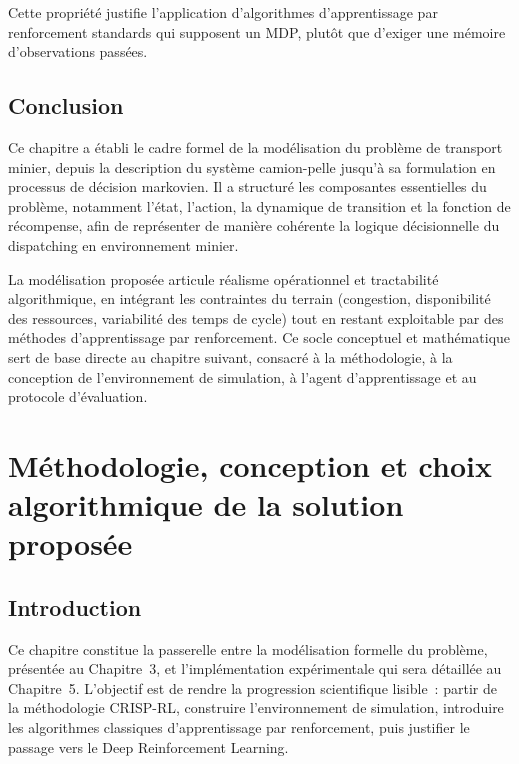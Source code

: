 \documentclass[11pt,a4paper]{report}
\begin{document}
Cette propriété justifie l'application d'algorithmes d'apprentissage par renforcement standards qui supposent un MDP, plutôt que d'exiger une mémoire d'observations passées.

\section{Conclusion}
\label{sec:conclusion-modelisation}

Ce chapitre a établi le cadre formel de la modélisation du problème de transport minier, depuis la description du système camion-pelle jusqu'à sa formulation en processus de décision markovien. Il a structuré les composantes essentielles du problème, notamment l'état, l'action, la dynamique de transition et la fonction de récompense, afin de représenter de manière cohérente la logique décisionnelle du dispatching en environnement minier.

La modélisation proposée articule réalisme opérationnel et tractabilité algorithmique, en intégrant les contraintes du terrain (congestion, disponibilité des ressources, variabilité des temps de cycle) tout en restant exploitable par des méthodes d'apprentissage par renforcement. Ce socle conceptuel et mathématique sert de base directe au chapitre suivant, consacré à la méthodologie, à la conception de l'environnement de simulation, à l'agent d'apprentissage et au protocole d'évaluation.

\chapter{Méthodologie, conception et choix algorithmique de la solution proposée}
\label{chap:methodologie}

\section*{Introduction}
Ce chapitre constitue la passerelle entre la modélisation formelle du problème, présentée au Chapitre~3, et l'implémentation expérimentale qui sera détaillée au Chapitre~5. L'objectif est de rendre la progression scientifique lisible~: partir de la méthodologie CRISP-RL, construire l'environnement de simulation, introduire les algorithmes classiques d'apprentissage par renforcement, puis justifier le passage vers le Deep Reinforcement Learning.
\end{document}
